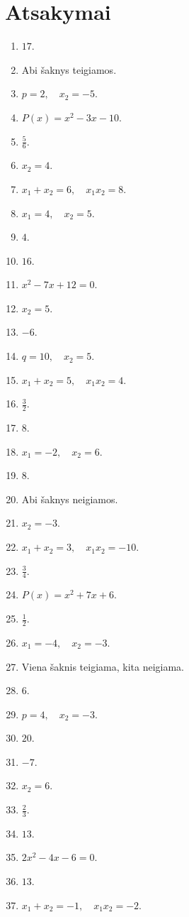 \documentclass[11pt,a4paper]{article}
\begin{document}
\section*{Atsakymai}
\begingroup\small
\setlength{\baselineskip}{11pt}
\begin{enumerate}
\item \(17\).
\item Abi šaknys teigiamos.
\item \(p=2,\quad x_2=-5\).
\item \(P(x)=x^2-3x-10\).
\item \(\frac{5}{6}\).
\item \(x_2=4\).
\item \(x_1+x_2=6,\quad x_1x_2=8\).
\item \(x_1=4,\quad x_2=5\).
\item \(4\).
\item \(16\).
\item \(x^2-7x+12=0\).
\item \(x_2=5\).
\item \(-6\).
\item \(q=10,\quad x_2=5\).
\item \(x_1+x_2=5,\quad x_1x_2=4\).
\item \(\frac{3}{2}\).
\item \(8\).
\item \(x_1=-2,\quad x_2=6\).
\item \(8\).
\item Abi šaknys neigiamos.
\item \(x_2=-3\).
\item \(x_1+x_2=3,\quad x_1x_2=-10\).
\item \(\frac{3}{4}\).
\item \(P(x)=x^2+7x+6\).
\item \(\frac{1}{2}\).
\item \(x_1=-4,\quad x_2=-3\).
\item Viena šaknis teigiama, kita neigiama.
\item \(6\).
\item \(p=4,\quad x_2=-3\).
\item \(20\).
\item \(-7\).
\item \(x_2=6\).
\item \(\frac{2}{3}\).
\item \(13\).
\item \(2x^2-4x-6=0\).
\item \(13\).
\item \(x_1+x_2=-1,\quad x_1x_2=-2\).

\end{enumerate}
\end{document}
